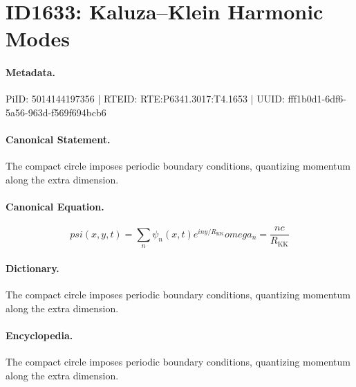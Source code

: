 \section*{ID1633: Kaluza–Klein Harmonic Modes}
\paragraph{Metadata.}
PiID: 5014144197356 | RTEID: RTE:P6341.3017:T4.1653 | UUID: fff1b0d1-6df6-5a56-963d-f569f694bcb6

\paragraph{Canonical Statement.}
The compact circle imposes periodic boundary conditions, quantizing momentum along the extra dimension.

\paragraph{Canonical Equation.}
\[
psi(x,y,t) = \sum_{n}\psi_n(x,t)e^{i n y/R_{\mathrm{KK}}} omega_n = \frac{n c}{R_{\mathrm{KK}}}
\]

\paragraph{Dictionary.}
The compact circle imposes periodic boundary conditions, quantizing momentum along the extra dimension.

\paragraph{Encyclopedia.}
The compact circle imposes periodic boundary conditions, quantizing momentum along the extra dimension.
